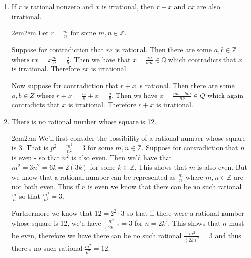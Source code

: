 \documentclass{article}
\newcommand{\Q}{\mathbb{Q}}
\newcommand{\Z}{\mathbb{Z}}
\let\endoldproof\endproof
\renewenvironment{proof}[1][\proofname]
  {\begin{adjustwidth}{2em}{2em}
   \oldproof[#1]}
  {\endoldproof
   \end{adjustwidth}}
\begin{document}
\begin{enumerate}[1.]
\item If $r$ is rational nonzero and $x$ is irrational, then $r + x$ and $rx$
      are also irrational.
      \begin{proof}
      Let $r = \frac{m}{n}$ for some $m, n \in \Z$.

      Suppose for contradiction that $rx$ is rational. Then there are some
      $a, b \in \Z$ where $rx = x\frac{m}{n} = \frac{a}{b}$. Then we have that
      $x = \frac{an}{bm} \in \Q$ which contradicts that $x$ is irrational.
      Therefore $rx$ is irrational.

      Now suppose for contradiction that $r + x$ is rational. Then there are
      some $a, b \in Z$ where $r + x = \frac{m}{n} + x = \frac{a}{b}$. Then we
      have $x = \frac{na - bm}{nb} \in Q$ which again contradicts that $x$ is
      irrational. Therefore $r + x$ is irrational.
      \end{proof}

\item There is no rational number whose square is 12.
      \begin{proof}
      We'll first consider the possibility of a rational number whose square is
      3. That is $p^2 = \frac{m^2}{n^2} = 3$ for some $m, n \in \Z$. Suppose
      for contradiction that $n$ is even - so that $n^2$ is also even. Then
      we'd have that $m^2 = 3n^2 = 6k = 2(3k)$ for some $k\in\Z$. This shows
      that $m$ is also even. But we know that a rational number can be
      represented as $\frac{m}{n}$ where $m, n \in \Z$ are not both even. Thus
      if $n$ is even we know that there can be no such rational $\frac{m}{n}$
      so that $\frac{m^2}{n^2} = 3$.

      Furthermore we know that $12 = 2^2 \cdot 3$ so that if there were a
      rational number whose square is 12, we'd have $\frac{m^2}{(2k)^2} = 3$
      for $n = 2k^2$. This shows that $n$ must be even, therefore we have there
      can be no such rational $\frac{m^2}{(2k)^2} = 3$ and thus there's no such
      rational $\frac{m^2}{k^2} = 12$.
      \end{proof}
\end{enumerate}
\end{document}
